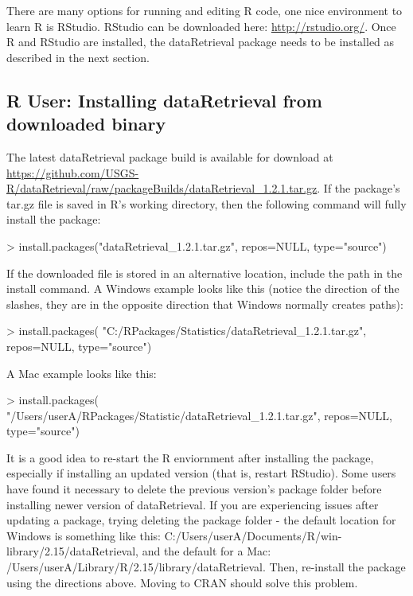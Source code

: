 \documentclass[a4paper,11pt]{article}
\begin{document}
There are many options for running and editing R code, one nice environment to learn R is RStudio. RStudio can be downloaded here: \url{http://rstudio.org/}. Once R and RStudio are installed, the dataRetrieval package needs to be installed as described in the next section.

\subsection{R User: Installing dataRetrieval from downloaded binary}
The latest dataRetrieval package build is available for download at \url{https://github.com/USGS-R/dataRetrieval/raw/packageBuilds/dataRetrieval_1.2.1.tar.gz}.  If the package's tar.gz file is saved in R's working directory, then the following command will fully install the package:

\begin{Schunk}
\begin{Sinput}
> install.packages("dataRetrieval_1.2.1.tar.gz", 
                  repos=NULL, type="source")
\end{Sinput}
\end{Schunk}

If the downloaded file is stored in an alternative location, include the path in the install command.  A Windows example looks like this (notice the direction of the slashes, they are in the opposite direction that Windows normally creates paths):

\begin{Schunk}
\begin{Sinput}
> install.packages(
   "C:/RPackages/Statistics/dataRetrieval_1.2.1.tar.gz", 
   repos=NULL, type="source")
\end{Sinput}
\end{Schunk}

A Mac example looks like this:

\begin{Schunk}
\begin{Sinput}
> install.packages(
   "/Users/userA/RPackages/Statistic/dataRetrieval_1.2.1.tar.gz", 
   repos=NULL, type="source")
\end{Sinput}
\end{Schunk}

It is a good idea to re-start the R enviornment after installing the package, especially if installing an updated version (that is, restart RStudio). Some users have found it necessary to delete the previous version's package folder before installing newer version of dataRetrieval. If you are experiencing issues after updating a package, trying deleting the package folder - the default location for Windows is something like this: C:/Users/userA/Documents/R/win-library/2.15/dataRetrieval, and the default for a Mac: /Users/userA/Library/R/2.15/library/dataRetrieval. Then, re-install the package using the directions above. Moving to CRAN should solve this problem.
\end{document}
